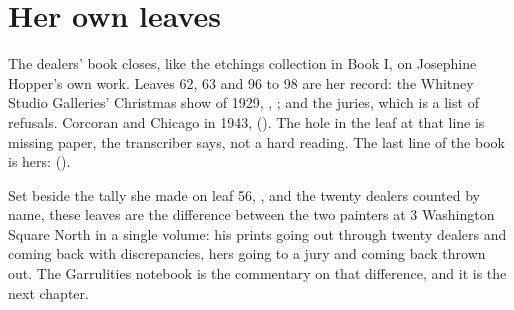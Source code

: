 \section{Her own leaves}

The dealers' book closes, like the etchings collection in Book I, on Josephine Hopper's own work. Leaves 62, 63 and 96 to 98 are her record: the Whitney Studio Galleries' Christmas show of 1929, , ; and the juries, which is a list of refusals.   Corcoran and Chicago in 1943,   (). The hole in the leaf at that line is missing paper, the transcriber says, not a hard reading. The last line of the book is hers:  ().

Set beside the tally she made on leaf 56, , and the twenty dealers counted by name, these leaves are the difference between the two painters at 3 Washington Square North in a single volume: his prints going out through twenty dealers and coming back with discrepancies, hers going to a jury and coming back thrown out. The Garrulities notebook is the commentary on that difference, and it is the next chapter.

